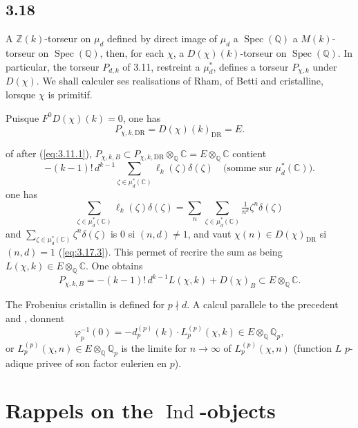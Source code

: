 \documentclass[12pt,a4paper]{article}
\theoremstyle{plain}
\theoremstyle{definition}
\theoremstyle{remark}
\DeclareMathOperator{\Spec}{Spec}
\DeclareMathOperator{\Ind}{Ind}
\providecommand{\Spec}{\operatorname{Spec}}
\providecommand{\DR}{\mathrm{DR}}
\begin{document}
\subsection*{3.18}

A $\mathbb{Z}(k)$-torseur on $\mu_d$ defined by direct image of $\mu_d$ a
$\Spec(\mathbb{Q})$ a $M(k)$-torseur on $\Spec(\mathbb{Q})$, then, for each
$\chi$, a $D(\chi)(k)$-torseur on $\Spec(\mathbb{Q})$. In particular, the torseur
$P_{d,k}$ of 3.11, restreint a $\mu_d^*$, defines a torseur $P_{\chi,k}$ under
$D(\chi)$. We shall calculer ses realisations of Rham, of Betti and cristalline,
lorsque $\chi$ is primitif.

Puisque $F^0 D(\chi)(k) = 0$, one has
\begin{equation}\label{eq:3.18.1}
P_{\chi,k,\DR} = D(\chi)(k)_{\DR} = E.
\end{equation}

of after (\ref{eq:3.11.1}), $P_{\chi,k,B} \subset P_{\chi,k,\DR} \otimes_{\mathbb{Q}}
\mathbb{C} = E \otimes_{\mathbb{Q}} \mathbb{C}$ contient
\[
-(k-1)!\, d^{k-1} \sum_{\zeta \in \mu_d^*(\mathbb{C})} \ell_k(\zeta)
\delta(\zeta) \quad \text{(somme sur } \mu_d^*(\mathbb{C})\text{)}.
\]
one has
\[
\sum_{\zeta \in \mu_d^*(\mathbb{C})} \ell_k(\zeta) \delta(\zeta) =
\sum_n \sum_{\zeta \in \mu_d^*(\mathbb{C})} \tfrac{1}{n^k} \zeta^n
\delta(\zeta)
\]
and $\sum_{\zeta \in \mu_d^*(\mathbb{C})} \zeta^n \delta(\zeta)$ is $0$ si
$(n,d) \neq 1$, and vaut $\chi(n) \in D(\chi)_{\DR}$ si $(n,d) = 1$
(\ref{eq:3.17.3}). This permet of recrire the sum as being $L(\chi, k) \in E
\otimes_{\mathbb{Q}} \mathbb{C}$. One obtains
\begin{equation}\label{eq:3.18.2}
P_{\chi,k,B} = -(k-1)!\, d^{k-1} L(\chi, k) + D(\chi)_B \subset E \otimes_{\mathbb{Q}}
\mathbb{C}.
\end{equation}

The Frobenius cristallin is defined for $p \nmid d$. A calcul parallele to the
precedent and \cite{C},\cite{Ko} donnent
\begin{equation}\label{eq:3.18.3}
\varphi_p^{-1}(0) = -d_p^{(p)}(k) \cdot L_p^{(p)}(\chi, k) \in E \otimes_{\mathbb{Q}}
\mathbb{Q}_p,
\end{equation}
or $L_p^{(p)}(\chi, n) \in E \otimes_{\mathbb{Q}} \mathbb{Q}_p$ is the limite for $n \to
\infty$ of $L_p^{(p)}(\chi, n)$ (function $L$ $p$-adique privee of son factor
eulerien en $p$).

\section{Rappels on the $\Ind$-objects}\label{sec:4}
\end{document}
